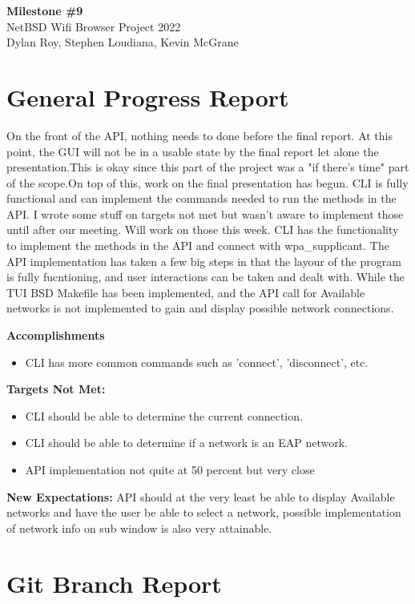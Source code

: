 \documentclass[11pt]{article}
\begin{document}
\begin{center}
  \textbf{\Large Milestone \#9}\\\large NetBSD Wifi Browser Project 2022\\
  Dylan Roy, Stephen Loudiana, Kevin McGrane
\end{center}

\section{General Progress Report}
On the front of the API, nothing needs to done before the final report.
At this point, the GUI will not be in a usable state by the final report
let alone the presentation.This is okay since this part of the project was 
a "if there's time" part of the scope.On top of this, work on the final 
presentation has begun. CLI is fully functional and can implement the 
commands needed to run the methods in the API. I wrote some stuff on 
targets not met but wasn't aware to implement those until after our 
meeting. Will work on those this week. CLI has the functionality to 
implement the methods in the API and connect with wpa\_supplicant. 
The API implementation has taken a few big steps in that the layour of the
program is fully fucntioning, and user interactions can be taken and dealt
with. While the TUI BSD Makefile has been implemented, and the API call for
Available networks is not implemented to gain and display possible network
connections.

\textbf{Accomplishments}
\begin{itemize}
  \item CLI has more common commands such as 'connect', 'disconnect', etc. 
\end{itemize}

\textbf{Targets Not Met:}
\begin{itemize}
  \item CLI should be able to determine the current connection. 
  \item CLI should be able to determine if a network is an EAP network. 
  \item API implementation not quite at 50 percent but very close 
\end{itemize}

\textbf{New Expectations:}
API should at the very least be able 
to display Available networks and have the user be able to select a network,
possible implementation of network info on sub window is also very attainable.

\section{Git Branch Report}
\end{document}
